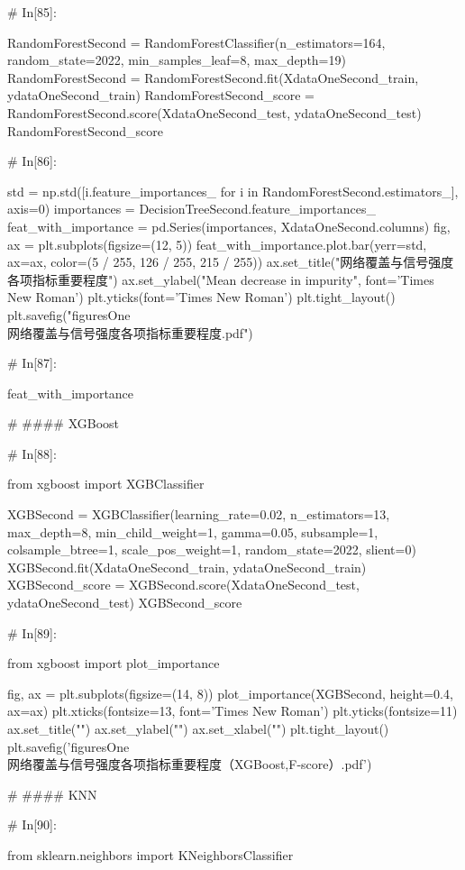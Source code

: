 \documentclass{MathorCupmodeling}
\begin{document}
\begin{python}
	# In[85]:
	
	
	RandomForestSecond = RandomForestClassifier(n_estimators=164, random_state=2022, min_samples_leaf=8, max_depth=19)
	RandomForestSecond = RandomForestSecond.fit(XdataOneSecond_train, ydataOneSecond_train)
	RandomForestSecond_score = RandomForestSecond.score(XdataOneSecond_test, ydataOneSecond_test)
	RandomForestSecond_score
	
	# In[86]:
	
	
	std = np.std([i.feature_importances_ for i in RandomForestSecond.estimators_], axis=0)
	importances = DecisionTreeSecond.feature_importances_
	feat_with_importance = pd.Series(importances, XdataOneSecond.columns)
	fig, ax = plt.subplots(figsize=(12, 5))
	feat_with_importance.plot.bar(yerr=std, ax=ax, color=(5 / 255, 126 / 255, 215 / 255))
	ax.set_title("网络覆盖与信号强度各项指标重要程度")
	ax.set_ylabel("Mean decrease in impurity", font='Times New Roman')
	plt.yticks(font='Times New Roman')
	plt.tight_layout()
	plt.savefig("figuresOne\\[附件1]网络覆盖与信号强度各项指标重要程度.pdf")
	
	# In[87]:
	
	
	feat_with_importance
	
	# #### XGBoost
	
	# In[88]:
	
	
	from xgboost import XGBClassifier
	
	XGBSecond = XGBClassifier(learning_rate=0.02,
							  n_estimators=13,
							  max_depth=8,
							  min_child_weight=1,
							  gamma=0.05,
							  subsample=1,
							  colsample_btree=1,
							  scale_pos_weight=1,
							  random_state=2022,
							  slient=0)
	XGBSecond.fit(XdataOneSecond_train, ydataOneSecond_train)
	XGBSecond_score = XGBSecond.score(XdataOneSecond_test, ydataOneSecond_test)
	XGBSecond_score
	
	# In[89]:
	
	
	from xgboost import plot_importance
	
	fig, ax = plt.subplots(figsize=(14, 8))
	plot_importance(XGBSecond, height=0.4, ax=ax)
	plt.xticks(fontsize=13, font='Times New Roman')
	plt.yticks(fontsize=11)
	ax.set_title("")
	ax.set_ylabel("")
	ax.set_xlabel("")
	plt.tight_layout()
	plt.savefig('figuresOne\\[附件1]网络覆盖与信号强度各项指标重要程度（XGBoost,F-score）.pdf')
	
	# #### KNN
	
	# In[90]:
	
	
	from sklearn.neighbors import KNeighborsClassifier
	

\end{python}
\end{document}
